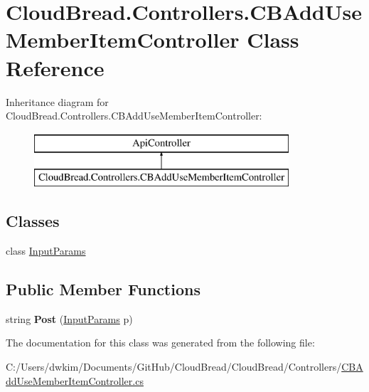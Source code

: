 \hypertarget{a00024}{}\section{Cloud\+Bread.\+Controllers.\+C\+B\+Add\+Use\+Member\+Item\+Controller Class Reference}
\label{a00024}
Inheritance diagram for Cloud\+Bread.\+Controllers.\+C\+B\+Add\+Use\+Member\+Item\+Controller\+:\begin{figure}[H]
\begin{center}
\leavevmode
\includegraphics[height=2.000000cm]{a00024}
\end{center}
\end{figure}
\subsection*{Classes}
\begin{DoxyCompactItemize}
\item 
class \hyperlink{a00102}{Input\+Params}
\end{DoxyCompactItemize}
\subsection*{Public Member Functions}
\begin{DoxyCompactItemize}
\item 
string {\bfseries Post} (\hyperlink{a00102}{Input\+Params} p)\hypertarget{a00024_aa1e7d18f4f7835c2f6c81d1972d1481a}{}\label{a00024_aa1e7d18f4f7835c2f6c81d1972d1481a}

\end{DoxyCompactItemize}


The documentation for this class was generated from the following file\+:\begin{DoxyCompactItemize}
\item 
C\+:/\+Users/dwkim/\+Documents/\+Git\+Hub/\+Cloud\+Bread/\+Cloud\+Bread/\+Controllers/\hyperlink{a00199}{C\+B\+Add\+Use\+Member\+Item\+Controller.\+cs}\end{DoxyCompactItemize}
